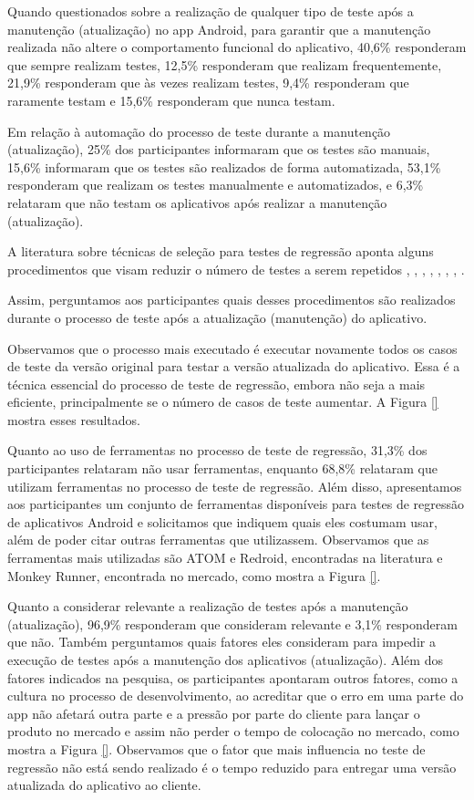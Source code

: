 \begin{enumerate}[label=\bf QP\arabic*]
Quando questionados sobre a realização de qualquer tipo de teste após a manutenção (atualização) no app Android, para garantir que a manutenção realizada não altere o comportamento funcional do aplicativo, 40,6\% responderam que sempre realizam testes, 12,5\% responderam que realizam frequentemente, 21,9\% responderam que às vezes realizam testes, 9,4\% responderam que raramente testam e 15,6\% responderam que nunca testam.

Em relação à automação do processo de teste durante a manutenção (atualização), 25\% dos participantes informaram que os testes são manuais, 15,6\% informaram que os testes são realizados de forma automatizada, 53,1\% responderam que realizam os testes manualmente e automatizados, e 6,3\% relataram que não testam os aplicativos após realizar a manutenção (atualização).

A literatura sobre técnicas de seleção para testes de regressão aponta alguns procedimentos que visam reduzir o número de testes a serem repetidos \cite{KAZMI2017}, \cite{Yoo:2012:RTM:2284811.2284813}, \cite{ENGSTROM201014}, \cite{Graves:2001:ESR:367008.367020}, \cite{Rothermel2000}, \cite{536955}, \cite{WHITE1991}, \cite{65194}.

Assim, perguntamos aos participantes quais desses procedimentos são realizados durante o processo de teste após a atualização (manutenção) do aplicativo.

Observamos que o processo mais executado é executar novamente todos os casos de teste da versão original para testar a versão atualizada do aplicativo. Essa é a técnica essencial do processo de teste de regressão, embora não seja a mais eficiente, principalmente se o número de casos de teste aumentar. A Figura \ref{} mostra esses resultados.

Quanto ao uso de ferramentas no processo de teste de regressão, 31,3\% dos participantes relataram não usar ferramentas, enquanto 68,8\% relataram que utilizam ferramentas no processo de teste de regressão. Além disso, apresentamos aos participantes um conjunto de ferramentas disponíveis para testes de regressão de aplicativos Android e solicitamos que indiquem quais eles costumam usar, além de poder citar outras ferramentas que utilizassem. Observamos que as ferramentas mais utilizadas são ATOM e Redroid, encontradas na literatura e Monkey Runner, encontrada no mercado, como mostra a Figura \ref{}.

Quanto a considerar relevante a realização de testes após a manutenção (atualização), 96,9\% responderam que consideram relevante e 3,1\% responderam que não. Também perguntamos quais fatores eles consideram para impedir a execução de testes após a manutenção dos aplicativos (atualização). Além dos fatores indicados na pesquisa, os participantes apontaram outros fatores, como a cultura no processo de desenvolvimento, ao acreditar que o erro em uma parte do app não afetará outra parte e a pressão por parte do cliente para lançar o produto no mercado e assim não perder o tempo de colocação no mercado, como mostra a Figura \ref{}. Observamos que o fator que mais influencia no teste de regressão não está sendo realizado é o tempo reduzido para entregar uma versão atualizada do aplicativo ao cliente.


\end{enumerate}
